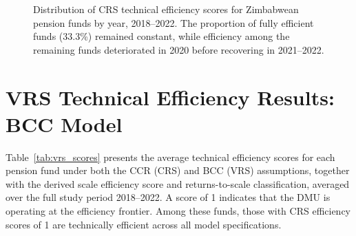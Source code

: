 \documentclass[12pt,a4paper]{article}
\begin{document}
\begin{figure}[H]
\centering
{}
\caption{Distribution of CRS technical efficiency scores for Zimbabwean pension funds by year, 2018--2022. The proportion of fully efficient funds (33.3\%) remained constant, while efficiency among the remaining funds deteriorated in 2020 before recovering in 2021--2022.}
\label{fig:crs_distribution}
\end{figure}

\section{VRS Technical Efficiency Results: BCC Model}

Table~\ref{tab:vrs_scores} presents the average technical efficiency scores for each pension fund under both the CCR (CRS) and BCC (VRS) assumptions, together with the derived scale efficiency score and returns-to-scale classification, averaged over the full study period 2018--2022. A score of 1 indicates that the DMU is operating at the efficiency frontier. Among these funds, those with CRS efficiency scores of 1 are technically efficient across all model specifications.
\end{document}
